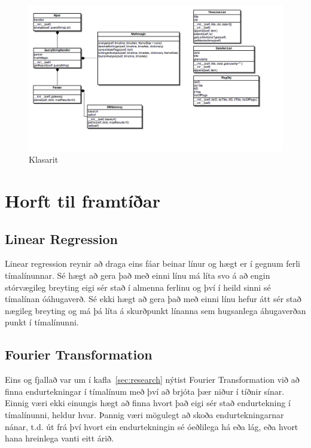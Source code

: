 \documentclass{article}
\begin{document}
\begin{figure}[H]
  \centering
  \includegraphics[width=.95\textwidth]{rynir_class_diagram.png} 
  \caption{Klasarit} 
\end{figure}

\section{Horft til framtíðar}
\label{sec:future}

\subsection{Linear Regression}
\label{sec:future_linear}
Linear regression reynir að draga eins fáar beinar línur og hægt er í gegnum ferli tímalínunnar.
Sé hægt að gera það með einni línu má líta svo á að engin stórvægileg breyting 
eigi sér stað í almenna ferlinu og því í heild sinni sé tímalínan óáhugaverð. 
Sé ekki hægt að gera það með einni línu hefur átt sér stað nægileg breyting og má þá líta á skurðpunkt línanna sem
hugsanlega áhugaverðan punkt í tímalínunni.

\subsection{Fourier Transformation}
\label{sec:future_fourier}
Eins og fjallað var um í kafla~\ref{sec:research} nýtist Fourier
Transformation við að finna endurtekningar í tímalínum með því að brjóta þær
niður í tíðnir sínar.  
Einnig væri ekki einungis hægt að finna hvort það eigi sér stað endurtekning í
tímalínunni, heldur hvar. Þannig væri mögulegt að skoða endurtekningarnar nánar,
t.d. út frá því hvort ein endurtekningin sé óeðlilega há eða lág, eða hvort hana
hreinlega vanti eitt árið.
\end{document}
